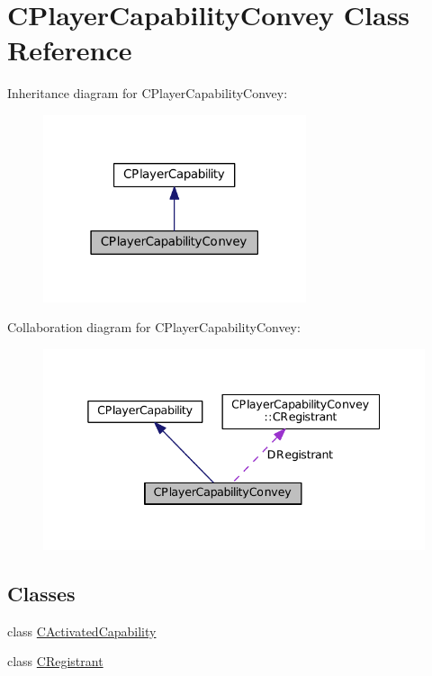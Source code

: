 \hypertarget{classCPlayerCapabilityConvey}{}\section{C\+Player\+Capability\+Convey Class Reference}
\label{classCPlayerCapabilityConvey}


Inheritance diagram for C\+Player\+Capability\+Convey\+:
\nopagebreak
\begin{figure}[H]
\begin{center}
\leavevmode
\includegraphics[width=219pt]{classCPlayerCapabilityConvey__inherit__graph}
\end{center}
\end{figure}


Collaboration diagram for C\+Player\+Capability\+Convey\+:
\nopagebreak
\begin{figure}[H]
\begin{center}
\leavevmode
\includegraphics[width=338pt]{classCPlayerCapabilityConvey__coll__graph}
\end{center}
\end{figure}
\subsection*{Classes}
\begin{DoxyCompactItemize}
\item 
class \hyperlink{classCPlayerCapabilityConvey_1_1CActivatedCapability}{C\+Activated\+Capability}
\item 
class \hyperlink{classCPlayerCapabilityConvey_1_1CRegistrant}{C\+Registrant}
\end{DoxyCompactItemize}
